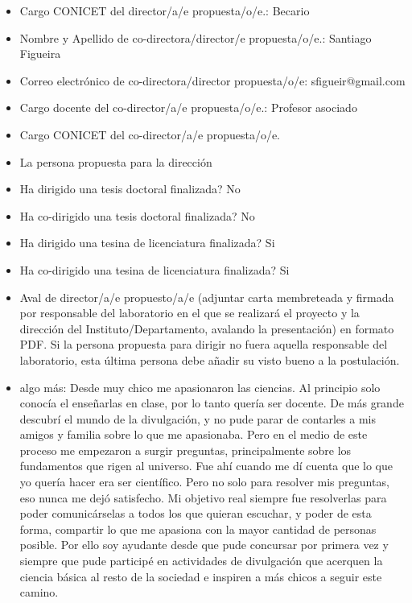 \documentclass{article}
\begin{document}
\begin{itemize}
    \item Cargo CONICET del director/a/e propuesta/o/e.: Becario

    \item Nombre y Apellido de co-directora/director/e propuesta/o/e.: Santiago Figueira

    \item Correo electrónico de co-directora/director propuesta/o/e: sfigueir@gmail.com

    \item Cargo docente del co-director/a/e propuesta/o/e.: Profesor asociado

    \item Cargo CONICET del co-director/a/e propuesta/o/e.

    \item La persona propuesta para la dirección
    
    \item Ha dirigido una tesis doctoral finalizada? No

    \item Ha co-dirigido una tesis doctoral finalizada? No

    \item Ha dirigido una tesina de licenciatura finalizada? Si

    \item Ha co-dirigido una tesina de licenciatura finalizada? Si

    \item Aval de director/a/e propuesto/a/e (adjuntar carta membreteada y firmada por responsable del laboratorio en el que se realizará el proyecto y la dirección del Instituto/Departamento, avalando la presentación) en formato PDF. Si la persona propuesta para dirigir no fuera aquella responsable del laboratorio, esta última persona debe añadir su visto bueno a la postulación.

    \item algo más: Desde muy chico me apasionaron las ciencias. Al principio solo conocía el enseñarlas en clase, por lo tanto quería ser docente. De más grande descubrí el mundo de la divulgación, y no pude parar de contarles a mis amigos y familia sobre lo que me apasionaba. Pero en el medio de este proceso me empezaron a surgir preguntas, principalmente sobre los fundamentos que rigen al universo. Fue ahí cuando me dí cuenta que lo que yo quería hacer era ser científico. Pero no solo para resolver mis preguntas, eso nunca me dejó satisfecho. Mi objetivo real siempre fue resolverlas para poder comunicárselas a todos los que quieran escuchar, y poder de esta forma, compartir lo que me apasiona con la mayor cantidad de personas posible. Por ello soy ayudante desde que pude concursar por primera vez y siempre que pude participé en actividades de divulgación que acerquen la ciencia básica al resto de la sociedad e inspiren a más chicos a seguir este camino.


\end{itemize}
\end{document}
